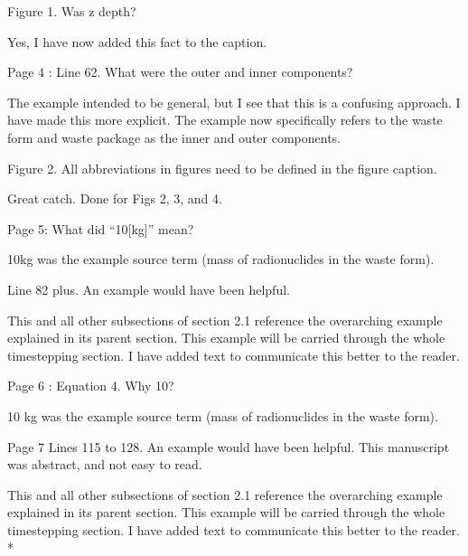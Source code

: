 \documentclass[answers,12pt]{exam}
\begin{document}
\begin{questions}
\question Figure 1. Was z depth?
\begin{solution}
Yes, I have now added this fact to the caption.
\end{solution}

\question Page 4 : Line 62. What were the outer and inner components?

\begin{solution}
        The example intended to be general, but I see that this is a confusing 
approach. I have made this more explicit. The example now specifically refers 
to the waste form and waste package as the inner and outer components.  
\end{solution}
 

\question Figure 2. All abbreviations in figures need to be defined in the figure caption.
\begin{solution}
Great catch. Done for Figs 2, 3, and 4.
\end{solution}
 

\question Page 5: What did ``10[kg]'' mean?
\begin{solution}
        10kg was the example source term (mass of radionuclides in the waste 
        form).
\end{solution}
 

\question Line 82 plus. An example would have been helpful.
\begin{solution}
This and all other subsections of section 2.1 reference the overarching example 
        explained in its parent section. This example will be carried through 
        the whole timestepping section. I have added text to communicate this 
        better to the reader. 
\end{solution}

 

\question Page 6 : Equation 4. Why 10?
\begin{solution}
        10 kg was the example source term (mass of radionuclides in the waste 
        form).
\end{solution}

\question Page 7 Lines 115 to 128. An example would have been helpful. This manuscript was abstract, and not easy to read.

\begin{solution}
This and all other subsections of section 2.1 reference the overarching example 
        explained in its parent section. This example will be carried through 
        the whole timestepping section. I have added text to communicate this 
        better to the reader. 
        {\color{red}*}
\end{solution}
 


\end{questions}
\end{document}
